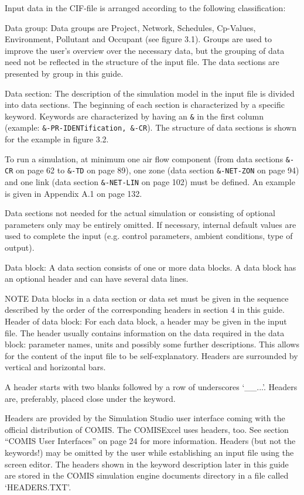 \documentclass[10pt]{book}
\begin{document}
Input data in the CIF-file is arranged according to the following classification:
 
Data group: Data groups are Project, Network, Schedules, Cp-Values, Environment, Pollutant and Occupant (see figure 3.1). Groups are used to improve the user's overview over the necessary data, but the grouping of data need not be reflected in the structure of the input file. The data sections are presented by group in this guide. 

Data section: The description of the simulation model in the input file is divided into data sections. The beginning of each section is characterized by a specific keyword. Keywords are characterized by having an \verb|&| in the first column (example: \verb|&-PR-IDENTification, &-CR|). The structure of data sections is shown for the example in figure 3.2. 

To run a simulation, at minimum one air flow component (from data sections \verb|&-CR| on page 62 to \verb|&-TD| on page 89), one zone (data section \verb|&-NET-ZON| on page 94) and one link (data section \verb|&-NET-LIN| on page 102) must be defined. An example is given in Appendix A.1 on page 132.

Data sections not needed for the actual simulation or consisting of optional parameters only may be entirely omitted. If necessary, internal default values are used to complete the input (e.g. control parameters, ambient conditions, type of output).

Data block: A data section consists of one or more data blocks. A data block has an optional header and can have several data lines.

NOTE Data blocks in a data section or data set must be given in the sequence described by the order of the corresponding headers in section 4 in this guide.
Header of data block: For each data block, a header may be given in the input file. The header usually contains information on the data required in the data block: parameter names, units and possibly some further descriptions. This allows for the content of the input file to be self-explanatory. Headers are surrounded by vertical and horizontal bars.

A header starts with two blanks followed by a row of underscores `\_\_...'. Headers are, preferably, placed close under the keyword.

Headers are provided by the Simulation Studio user interface coming with the official distribution of COMIS. The COMISExcel uses headers, too. See section ``COMIS User Interfaces'' on page 24 for more information. Headers (but not the keywords!) may be omitted by the user while establishing an input file using the screen editor. The headers shown in the keyword description later in this guide are stored in the COMIS simulation engine documents directory in a file called `HEADERS.TXT'.
\end{document}
